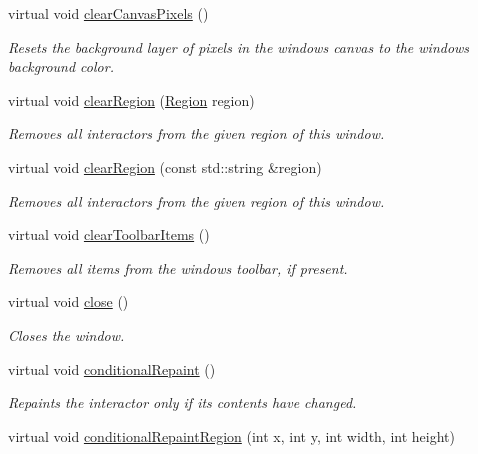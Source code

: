 \begin{DoxyCompactItemize}
virtual void \mbox{\hyperlink{classGWindow_a0c30950304fa997055183be1d212a262}{clear\+Canvas\+Pixels}} ()
\begin{DoxyCompactList}\small\item\em Resets the background layer of pixels in the window\textquotesingle{}s canvas to the window\textquotesingle{}s background color. \end{DoxyCompactList}\item 
virtual void \mbox{\hyperlink{classGWindow_a47f0cc45498a78757fa4d0e6befc2981}{clear\+Region}} (\mbox{\hyperlink{classGWindow_a81a01a86de31071a92e6cce0bab9bc4b}{Region}} region)
\begin{DoxyCompactList}\small\item\em Removes all interactors from the given region of this window. \end{DoxyCompactList}\item 
virtual void \mbox{\hyperlink{classGWindow_aeba526cb4d6d6f3d8d6f376656af8dc8}{clear\+Region}} (const std\+::string \&region)
\begin{DoxyCompactList}\small\item\em Removes all interactors from the given region of this window. \end{DoxyCompactList}\item 
virtual void \mbox{\hyperlink{classGWindow_a7f7fac3c967032599677ee0087af2220}{clear\+Toolbar\+Items}} ()
\begin{DoxyCompactList}\small\item\em Removes all items from the window\textquotesingle{}s toolbar, if present. \end{DoxyCompactList}\item 
virtual void \mbox{\hyperlink{classGWindow_a5ae591df94fc66ccb85cbb6565368bca}{close}} ()
\begin{DoxyCompactList}\small\item\em Closes the window. \end{DoxyCompactList}\item 
virtual void \mbox{\hyperlink{classGDrawingSurface_a221b3e75bb3d9d0bfea62b3364e6773b}{conditional\+Repaint}} ()
\begin{DoxyCompactList}\small\item\em Repaints the interactor only if its contents have changed. \end{DoxyCompactList}\item 
virtual void \mbox{\hyperlink{classGDrawingSurface_aedd4b792311d946eeaf44b0de337a408}{conditional\+Repaint\+Region}} (int x, int y, int width, int height)

\end{DoxyCompactItemize}
